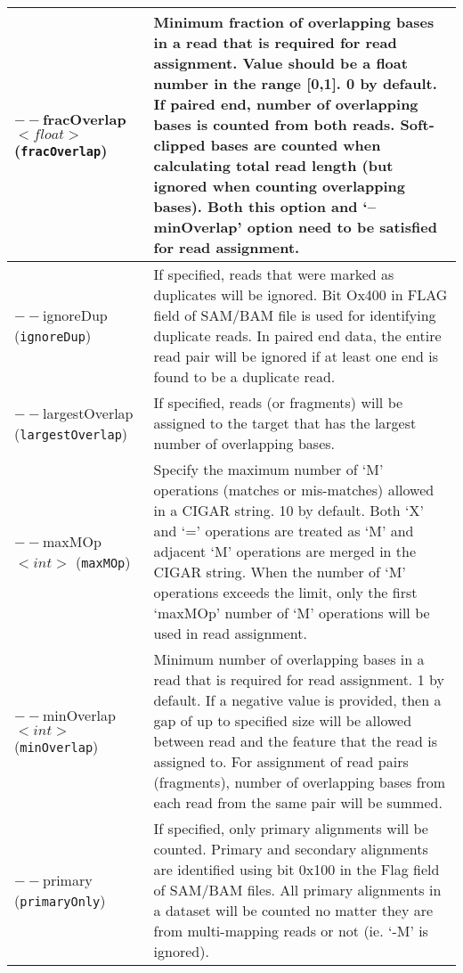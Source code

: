 \documentclass[12pt]{report}
\newcommand{\code}[1]{{\small\texttt{#1}}}
\begin{document}
\begin{longtable}{|p{5cm}|p{11cm}|}
\hline
$--$fracOverlap $<float>$ \newline (\code{fracOverlap}) & Minimum fraction of overlapping bases in a read that is required for read assignment. Value should be a float number in the range [0,1]. 0 by default. If paired end, number of overlapping bases is counted from both reads. Soft-clipped bases are counted when calculating total read length (but ignored when counting overlapping bases). Both this option and `--minOverlap' option need to be satisfied for read assignment. \\
\hline
$--$ignoreDup \newline (\code{ignoreDup}) & If specified, reads that were marked as duplicates will be ignored. Bit Ox400 in FLAG field of SAM/BAM file is used for identifying duplicate reads. In paired end data, the entire read pair will be ignored if at least one end is found to be a duplicate read.\\
\hline
$--$largestOverlap \newline (\code{largestOverlap}) & If specified, reads (or fragments) will be assigned to the target that has the largest number of overlapping bases.\\
\hline
$--$maxMOp $<int>$ \newline (\code{maxMOp}) & Specify the maximum number of `M' operations (matches or mis-matches) allowed in a CIGAR string. 10 by default. Both `X' and `=' operations are treated as `M' and adjacent `M' operations are merged in the CIGAR string. When the number of `M' operations exceeds the limit, only the first `maxMOp' number of `M' operations will be used in read assignment.\\
\hline
$--$minOverlap $<int>$ \newline (\code{minOverlap}) & Minimum number of overlapping bases in a read that is required for read assignment. 1 by default. If a negative value is provided, then a gap of up to specified size will be allowed between read and the feature that the read is assigned to. For assignment of read pairs (fragments), number of overlapping bases from each read from the same pair will be summed. \\
\hline
$--$primary \newline (\code{primaryOnly}) & If specified, only primary alignments will be counted. Primary and secondary alignments are identified using bit 0x100 in the Flag field of SAM/BAM files. All primary alignments in a dataset will be counted no matter they are from multi-mapping reads or not (ie. `-M' is ignored).\\

\end{longtable}
\end{document}

